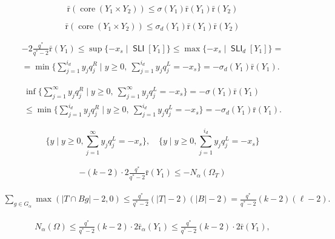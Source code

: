\documentclass[10pt, reqno]{article}
\begin{document}
\begin{equation*}
{\bar {\mathrm{r}}} ( \operatorname{core}(Y_1 \times  Y_2) )  \le  \sigma(Y_1)  {\bar {\mathrm{r}}}(Y_1) {\bar {\mathrm{r}}}(Y_2)
\end{equation*}

\begin{equation*}
{\bar {\mathrm{r}}} ( \operatorname{core}(Y_1 \times  Y_2) )  \le  \sigma_d(Y_1)  {\bar {\mathrm{r}}}(Y_1) {\bar {\mathrm{r}}}(Y_2)
\end{equation*}

\begin{multline}
\label{st3}
- 2 \tfrac{q^*}{q^*-2} {\bar {\mathrm{r}}}(Y_1) \le \sup \{ - x_s \mid \operatorname{\textsf{SLI}} [Y_1]\}    \le   \max \{ - x_s \mid \operatorname{\textsf{SLI}}_d[Y_1]\}  = \\  = \min \{ \sum_{j=1}^{i_d}
 y_j q_j^R   \mid y \ge 0 , \ \sum_{j=1}^{i_d}   y_j q_j^L  = - x_s \} =
 - \sigma_d(Y_1) {\bar {\mathrm{r}}}(Y_1)  .
\end{multline}

\begin{multline}
\label{st3a}
\inf   \{  \sum_{j=1}^{\infty}   y_j q_j^R   \mid y \ge 0 , \
\sum_{j=1}^{\infty}   y_j q_j^L  = - x_s \} =  - \sigma(Y_1) {\bar {\mathrm{r}}}(Y_1) \\ \le
\min   \{  \sum_{j=1}^{i_d}   y_j q_j^R   \mid y \ge 0 , \
\sum_{j=1}^{i_d}   y_j q_j^L  = - x_s \} = - \sigma_d(Y_1)  {\bar {\mathrm{r}}}(Y_1) .
\end{multline}

$$
\{  y   \mid y \ge 0 , \sum_{j=1}^{\infty}  y_j q_j^L  = - x_s \} ,   \quad \{  y   \mid y \ge 0 , \sum_{j=1}^{i_d}  y_j q_j^L  = - x_s \}
$$

\begin{align}\label{dd1}
 -(k-2)\cdot 2\tfrac{q^*}{q^*-2} {\bar {\mathrm{r}}}(Y_1) \le -   N_{\alpha}(\Omega_T)
\end{align}

\begin{align}\label{dd2}
\sum_{g \in G_{\alpha}} \max(|T \cap Bg | -2, 0)  \le \tfrac{q^*}{q^*-2}(|T|-2)(|B|-2) =
\tfrac{q^*}{q^*-2}(k-2)(\ell-2) .
\end{align}

\begin{align*}
N_{\alpha}(\Omega)   \le \tfrac{q^*}{q^*-2} (k-2) \cdot 2 {\bar {\mathrm{r}}}_{\alpha} (Y_1)  \le \tfrac{q^*}{q^*-2} (k-2) \cdot 2 {\bar {\mathrm{r}}} (Y_1)    ,
\end{align*}
\end{document}
